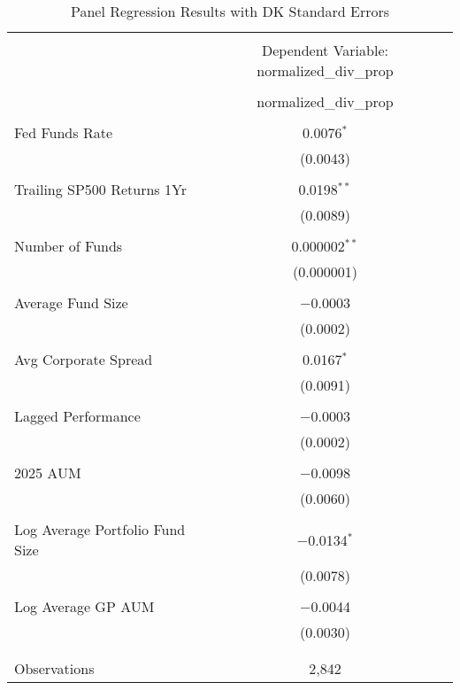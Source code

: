 
\begin{table}[!htbp] \centering 
  \caption{Panel Regression Results with DK Standard Errors} 
  \label{tab:regression} 
\begin{tabular}{@{\extracolsep{5pt}}lc} 
\\[-1.8ex]\hline 
\hline \\[-1.8ex] 
 & \multicolumn{1}{c}{Dependent Variable: normalized\_div\_prop} \\ 
\cline{2-2} 
\\[-1.8ex] & normalized\_div\_prop \\ 
\hline \\[-1.8ex] 
 Fed Funds Rate & 0.0076$^{*}$ \\ 
  & (0.0043) \\ 
  & \\ 
 Trailing SP500 Returns 1Yr & 0.0198$^{**}$ \\ 
  & (0.0089) \\ 
  & \\ 
 Number of Funds & 0.000002$^{**}$ \\ 
  & (0.000001) \\ 
  & \\ 
 Average Fund Size & $-$0.0003 \\ 
  & (0.0002) \\ 
  & \\ 
 Avg Corporate Spread & 0.0167$^{*}$ \\ 
  & (0.0091) \\ 
  & \\ 
 Lagged Performance & $-$0.0003 \\ 
  & (0.0002) \\ 
  & \\ 
 2025 AUM & $-$0.0098 \\ 
  & (0.0060) \\ 
  & \\ 
 Log Average Portfolio Fund Size & $-$0.0134$^{*}$ \\ 
  & (0.0078) \\ 
  & \\ 
 Log Average GP AUM & $-$0.0044 \\ 
  & (0.0030) \\ 
  & \\ 
\hline \\[-1.8ex] 
Observations & 2,842 \\ 

\end{tabular}
\end{table}
